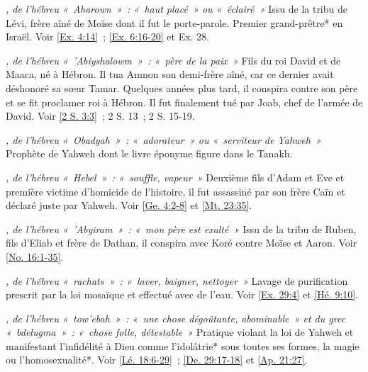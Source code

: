 \begin{multicols}{2}

\textit{, de l'hébreu «~Aharown~»~: «~haut placé~» ou «~éclairé~»}\newline
Issu de la tribu de Lévi, frère aîné de Moïse dont il fut le porte-parole. Premier grand-prêtre* en Israël.\newline
Voir \vref{Ex. 4:14}~; \vref{Ex. 6:16-20} et Ex. 28.

\textit{, de l'hébreu «~'Abiyshalowm~»~: «~père de la paix~»}\newline
Fils du roi David et de Maaca, né à Hébron. Il tua Amnon son demi-frère aîné, car ce dernier avait déshonoré sa sœur Tamar. Quelques années plus tard, il conspira contre son père et se fit proclamer roi à Hébron. Il fut finalement tué par Joab, chef de l'armée de David.\newline
Voir \vref{2 S. 3:3}~; 2 S. 13~; 2 S. 15-19.

\textit{, de l'hébreu «~Obadyah~»~: «~adorateur~» ou «~serviteur de Yahweh~»}\newline
Prophète de Yahweh dont le livre éponyme figure dans le Tanakh.

\textit{, de l'hébreu «~Hebel~»~: «~souffle, vapeur~»}\newline
Deuxième fils d'Adam et Eve et première victime d'homicide de l'histoire, il fut assassiné par son frère Caïn et déclaré juste par Yahweh.\newline
Voir \vref{Ge. 4:2-8} et \vref{Mt. 23:35}.

\textit{, de l'hébreu «~'Abyiram~»~: «~mon père est exalté~»}\newline
Issu de la tribu de Ruben, fils d'Eliab et frère de Dathan, il conspira avec Koré contre Moïse et Aaron.\newline
Voir \vref{No. 16:1-35}.

\textit{, de l'hébreu «~rachats~»~: «~laver, baigner, nettoyer~»}\newline
Lavage de purification prescrit par la loi mosaïque et effectué avec de l'eau.\newline
Voir \vref{Ex. 29:4} et \vref{Hé. 9:10}.

\textit{, de l'hébreu «~tow'ebah~»~: «~une chose dégoûtante, abominable~» et du grec «~bdelugma~»~: «~chose folle, détestable~»}\newline
Pratique violant la loi de Yahweh et manifestant l'infidélité à Dieu comme l'idolâtrie* sous toutes ses formes, la magie ou l'homosexualité*.\newline
Voir \vref{Lé. 18:6-29}~; \vref{De. 29:17-18} et \vref{Ap. 21:27}.


\end{multicols}
